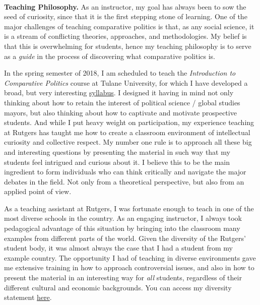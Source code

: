 \vspace{-2cm}{\bf \huge Teaching Statement}\\

{\bf Teaching Philosophy.} As an instructor, my goal has always been to sow the seed of curiosity, since that it is the first stepping stone of learning. One of the major challenges of teaching comparative politics is that, as any social science, it is a stream of conflicting theories, approaches, and methodologies. My belief is that this is overwhelming for students, hence my teaching philosophy is to serve as a \emph{guide} in the process of discovering what comparative politics is.


In the spring semester of 2018, I am scheduled to teach the \emph{Introduction to Comparative Politics} course at Tulane University, for which I have developed a broad, but very interesting \href{https://github.com/hbahamonde/Comparative_Politics_UGRAD/raw/master/Bahamonde_Comparative_Politics_Syllabus_UGRAD.pdf}{syllabus}. I designed it having in mind not only thinking about how to retain the interest of political science / global studies mayors, but also thinking about how to captivate and motivate prospective students. And while I put heavy weight on participation, my experience teaching at Rutgers has taught me how to create a classroom environment of intellectual curiosity and collective respect. My number one rule is to approach all these big and interesting questions by presenting the material in such way that my students feel intrigued and curious about it. I believe this to be the main ingredient to form individuals who can think critically and navigate the major debates in the field. Not only from a theoretical perspective, but also from an applied point of view.

As a teaching assistant at Rutgers, I was fortunate enough to teach in one of the most diverse schools in the country. As an engaging instructor, I always took pedagogical advantage of this situation by bringing into the classroom many examples from different parts of the world. Given the diversity of the Rutgers' student body, it was almost always the case that I had a student from my example country. The opportunity I had of teaching in diverse environments gave me extensive training in how to approach controversial issues, and also in how to present the material in an interesting way for \emph{all} students, regardless of their different cultural and economic backgrounds. You can access my diversity statement \href{http://github.com/hbahamonde/Job_Market/raw/master/Bahamonde_Diversity_Statement.pdf}{here}.



